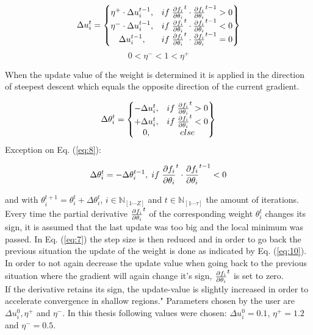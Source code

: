 \begin{equation}\label{eq:7}
	\Delta u^t_i =
	\begin{Bmatrix}
		 \eta^+ \cdot \Delta u^{t-1}_i, & if \hspace{1 mm} \pdv{f_i}{\theta_i}^t \cdot \pdv{f_i}{\theta_i}^{t-1} > 0 \\
		 \eta^- \cdot \Delta u^{t-1}_i, & if \hspace{1 mm} \pdv{f_i}{\theta_i}^t \cdot \pdv{f_i}{\theta_i}^{t-1} < 0 \\
		  \Delta u^{t-1}_i, & if \hspace{1 mm} \pdv{f_i}{\theta_i}^t \cdot \pdv{f_i}{\theta_i}^{t-1} = 0 \\
	\end{Bmatrix}
\end{equation}
\begin{equation}\label{eq:9}
0 <\eta^-<1<\eta^+
\end{equation}

When the update value of the weight is determined it is applied in the direction of steepest descent which equals the opposite direction of the current gradient. 

\begin{equation}\label{eq:8}
\Delta \theta^t_i =
\begin{Bmatrix}
	-\Delta u^t_i, & if \hspace{1 mm} \pdv{f_i}{\theta_i}^t > 0 \\
	+ \Delta u^t_i, & if \hspace{1 mm} \pdv{f_i}{\theta_i}^t < 0 \\
	0, & else 
\end{Bmatrix}
\end{equation}
Exception on Eq. (\ref{eq:8}):

\begin{equation}\label{eq:10}
	\Delta \theta^t_i = -\Delta \theta^{t-1}_i, \hspace{1mm} if \hspace{1mm} \pdv{f_i}{\theta_i}^t \cdot \pdv{f_i}{\theta_i}^{t-1} < 0
\end{equation}



and with $\theta_i^{t+1} = \theta_i^{t} + \Delta \theta^t_i$, $i \in \mathbb{N}_{[1\cdots Z]}$ and $t \in \mathbb{N}_{[1 \cdots \mathbb{\tau}]}$ the amount of iterations. Every time the partial derivative $\pdv{f_i}{\theta_i}^t$ of the corresponding weight $\theta_i^t$ changes its sign, it is assumed that the last update was too big and the local minimum was passed. In Eq. (\ref{eq:7}) the step size is then reduced and in order to go back the previous situation the update of the weight is done as indicated by Eq. (\ref{eq:10}). In order to not again decrease the update value when going back to the previous situation where the gradient will again change it's sign,  $\pdv{f_i}{\theta_i}^{t}$ is set to zero.\\
If the derivative retains its sign, the update-value is slightly increased in order to accelerate convergence in shallow regions." \cite{RPROP} Parameters chosen by the user are $\Delta u^0_i, \eta^+$ and $\eta^-$. In this thesis following values were chosen: $\Delta u^0_i = 0.1$, $\eta^+ = 1.2$ and $\eta^- = 0.5$.

